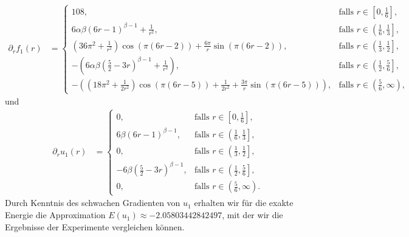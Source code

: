 \begin{align*}
  \partial_r f_1(r)
  &=
  \begin{cases}
    108,
    & \text{falls } r\in\left[0,\frac{1}{6}\right],\\
    6\alpha\beta(6r-1)^{\beta-1} +\frac{1}{r^2}, 
    & \text{falls } r\in\left(\frac{1}{6},\frac{1}{3}\right],\\
    \left(36\pi^2+\frac{1}{r^2}\right)\cos(\pi(6r-2))
    + \frac{6\pi}{r}\sin(\pi(6r-2)), 
    & \text{falls } r\in\left(\frac{1}{3},\frac{1}{2}\right],\\
    -\left(6\alpha\beta\left( \frac{5}{2}-3r \right)^{\beta-1}+
    \frac{1}{r^2}\right),
    & \text{falls } r\in\left(\frac{1}{2},\frac{5}{6}\right],\\
    -\left( \left( 18\pi^2+\frac{1}{2r^2} \right)\cos(\pi(6r-5))
    +\frac{1}{2r^2} + \frac{3\pi}{r}\sin(\pi(6r-5))\right), 
    &\text{falls } r\in\left(\frac{5}{6},\infty\right),
  \end{cases}
\end{align*}
und 
\begin{align*}
  \partial_r u_1(r) 
  &= 
  \begin{cases}
    0,
    & \text{falls } r\in\left[0,\frac{1}{6}\right],\\
    6\beta(6r-1)^{\beta-1}, 
    & \text{falls } r\in\left(\frac{1}{6},\frac{1}{3}\right],\\
    0, 
    & \text{falls } r\in\left(\frac{1}{3},\frac{1}{2}\right],\\
    -6\beta\left( \frac{5}{2}-3r \right)^{\beta-1},
    & \text{falls } r\in\left(\frac{1}{2},\frac{5}{6}\right],\\
    0,
    &\text{falls } r\in\left(\frac{5}{6},\infty\right).
  \end{cases}
\end{align*}
Durch Kenntnis des schwachen Gradienten von $u_1$ erhalten wir für die
exakte Energie die Approximation $E(u_1)\approx -2.05803442842497$, mit der
wir die Ergebnisse der Experimente vergleichen können.

